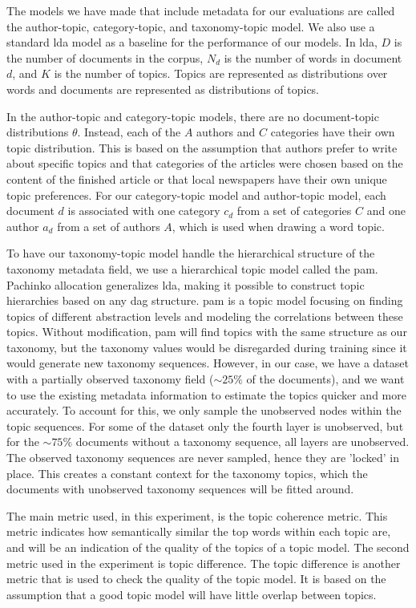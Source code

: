 The models we have made that include metadata for our evaluations are called the author-topic, category-topic, and taxonomy-topic model.
We also use a standard \gls{lda} model as a baseline for the performance of our models.
In \gls{lda}, $D$ is the number of documents in the corpus, $N_d$ is the number of words in document $d$, and $K$ is the number of topics.
Topics are represented as distributions over words and documents are represented as distributions of topics.

In the author-topic and category-topic models, there are no document-topic distributions $\theta$.
Instead, each of the $A$ authors and $C$ categories have their own topic distribution.
This is based on the assumption that authors prefer to write about specific topics and that categories of the articles were chosen based on the content of the finished article or that local newspapers have their own unique topic preferences.
For our category-topic model and author-topic model, each document $d$ is associated with one category $c_d$ from a set of categories $C$ and one author $a_d$ from a set of authors $A$, which is used when drawing a word topic.

To have our taxonomy-topic model handle the hierarchical structure of the taxonomy metadata field, we use a hierarchical topic model called the \acrfull{pam}.
Pachinko allocation generalizes \gls{lda}, making it possible to construct topic hierarchies based on any \gls{dag} structure.
\gls{pam} is a topic model focusing on finding topics of different abstraction levels and modeling the correlations between these topics.
Without modification, \gls{pam} will find topics with the same structure as our taxonomy, but the taxonomy values would be disregarded during training since it would generate new taxonomy sequences.
However, in our case, we have a dataset with a partially observed taxonomy field (${\sim}25\%$ of the documents), and we want to use the existing metadata information to estimate the topics quicker and more accurately.
To account for this, we only sample the unobserved nodes within the topic sequences.
For some of the dataset only the fourth layer is unobserved, but for the ${\sim}75\%$ documents without a taxonomy sequence, all layers are unobserved.
The observed taxonomy sequences are never sampled, hence they are 'locked' in place.
This creates a constant context for the taxonomy topics, which the documents with unobserved taxonomy sequences will be fitted around.

The main metric used, in this experiment, is the topic coherence metric.
This metric indicates how semantically similar the top words within each topic are, and will be an indication of the quality of the topics of a topic model.
The second metric used in the experiment is topic difference.
The topic difference is another metric that is used to check the quality of the topic model.
It is based on the assumption that a good topic model will have little overlap between topics.

